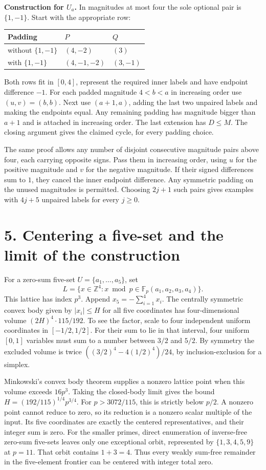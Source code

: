 \documentclass[11pt]{article}
\newcommand{\F}{\mathbb F}
\newcommand{\Z}{\mathbb Z}
\newcommand{\sect}[1]{\section*{\color{ink}#1}}
\begin{document}
\textbf{Construction for $U_a$.} In magnitudes at most four the sole optional pair is $\{1,-1\}$. Start with the appropriate row:
\begin{center}
\begin{tabular}{lll}\toprule
Padding & $P$ & $Q$\\\midrule
without $\{1,-1\}$ & $(4,-2)$ & $(3)$\\
with $\{1,-1\}$ & $(4,-1,-2)$ & $(3,-1)$\\\bottomrule
\end{tabular}
\end{center}
Both rows fit in $[0,4]$, represent the required inner labels and have endpoint difference $-1$. For each padded magnitude $4<b<a$ in increasing order use $(u,v)=(b,b)$. Next use $(a+1,a)$, adding the last two unpaired labels and making the endpoints equal. Any remaining padding has magnitude bigger than $a+1$ and is attached in increasing order. The last extension has $D\le M$. The closing argument gives the claimed cycle, for every padding choice.

The same proof allows any number of disjoint consecutive magnitude pairs above four, each carrying opposite signs. Pass them in increasing order, using $u$ for the positive magnitude and $v$ for the negative magnitude. If their signed differences sum to $1$, they cancel the inner endpoint difference. Any symmetric padding on the unused magnitudes is permitted. Choosing $2j+1$ such pairs gives examples with $4j+5$ unpaired labels for every $j\ge0$.
\newpage
\sect{5. Centering a five-set and the limit of the construction}
For a zero-sum five-set $U=\{a_1,\ldots,a_5\}$, set
\[
 L=\{x\in\Z^4:x\bmod p\in\F_p(a_1,a_2,a_3,a_4)\}.
\]
This lattice has index $p^3$. Append $x_5=-\sum_{i=1}^4x_i$. The centrally symmetric convex body given by $|x_i|\le H$ for all five coordinates has four-dimensional volume $(2H)^4\cdot115/192$. To see the factor, scale to four independent uniform coordinates in $[-1/2,1/2]$. For their sum to lie in that interval, four uniform $[0,1]$ variables must sum to a number between $3/2$ and $5/2$. By symmetry the excluded volume is twice $((3/2)^4-4(1/2)^4)/24$, by inclusion-exclusion for a simplex.

Minkowski's convex body theorem supplies a nonzero lattice point when this volume exceeds $16p^3$. Taking the closed-body limit gives the bound $H=(192/115)^{1/4}p^{3/4}$. For $p>3072/115$, this is strictly below $p/2$. A nonzero point cannot reduce to zero, so its reduction is a nonzero scalar multiple of the input. Its five coordinates are exactly the centered representatives, and their integer sum is zero. For the smaller primes, direct enumeration of inverse-free zero-sum five-sets leaves only one exceptional orbit, represented by $\{1,3,4,5,9\}$ at $p=11$. That orbit contains $1+3=4$. Thus every weakly sum-free remainder in the five-element frontier can be centered with integer total zero.
\end{document}
